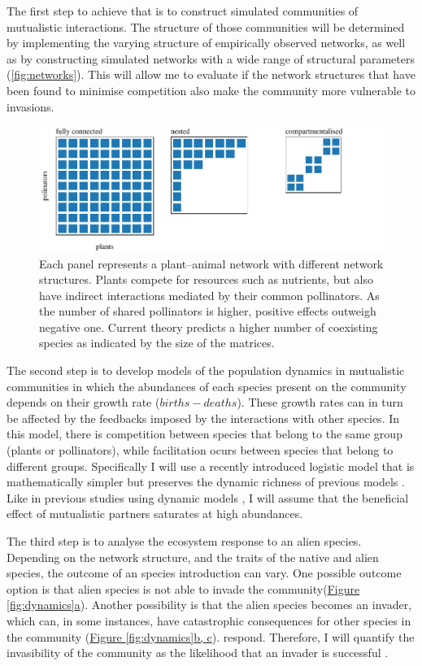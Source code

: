 \documentclass[a4paper]{article}
\begin{document}
The first step to achieve that is to construct simulated communities of mutualistic interactions.
The structure of those communities will be determined by implementing the varying structure of empirically observed networks, as well as by constructing simulated networks with a wide range of structural parameters (\autoref{fig:networks}).
This will allow me to evaluate if the network structures that have been found to minimise competition also make the community more vulnerable to invasions.

\begin{figure}[tbp]
  \includegraphics{networks}
  \caption{
  \label{fig:networks}
  Each panel represents a plant–animal network with different network structures.
  Plants compete for resources such as nutrients, but also have indirect interactions mediated by their common pollinators.
  As the number of shared pollinators is higher, positive effects outweigh negative one.
  Current theory predicts a higher number of coexisting species as indicated by the size of the matrices.
  }
\end{figure}

The second step is to develop models of the population dynamics in mutualistic communities in which the abundances of each species present on the community depends on their growth rate ($births - deaths$).
These growth rates can in turn be affected by the feedbacks imposed by the interactions with other species.
In this model, there is competition between species that belong to the same group (plants or pollinators), while facilitation ocurs between species that belong to different groups.
Specifically I will use a recently introduced logistic model that is mathematically simpler but preserves the dynamic richness of previous models \autocite{Garcia-Algarra2013}.
Like in previous studies using dynamic models \autocite{Okuyama2008, Bastolla2009}, I will assume that the beneficial effect of mutualistic partners saturates at high abundances.

The third step is to analyse the ecosystem response to an alien species.
Depending on the network structure, and the traits of the native and alien species, the outcome of an species introduction can vary.
One possible outcome option is that alien species is not able to invade the community(\hyperref[fig:dynamics]{Figure \ref{fig:dynamics}a}).
Another possibility is that the alien species becomes an invader, which can, in some instances, have catastrophic consequences for other species in the community (\hyperref[fig:dynamics]{Figure \ref{fig:dynamics}b, c}).
respond.
Therefore, I will quantify the invasibility of the community as the likelihood that an invader is successful \autocite{Ives2007, Romanuk2009}.
\end{document}
